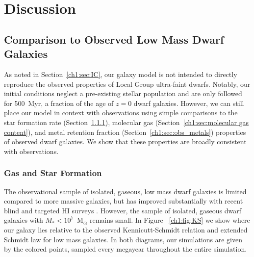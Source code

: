 \section{Discussion}
\label{ch1:sec:discussion}

\subsection{Comparison to Observed Low Mass Dwarf Galaxies}
\label{ch1:sec:observation}

As noted in Section~\ref{ch1:sec:IC}, our galaxy model is not intended to directly reproduce the observed properties of Local Group ultra-faint dwarfs. Notably, our initial conditions neglect a pre-existing stellar population and are only followed for 500~Myr, a fraction of the age of $z = 0$ dwarf galaxies. However, we can still place our model in context with observations using simple comparisons to the star formation rate (Section~\ref{ch1:sec:gas_sf}), molecular gas (Section~\ref{ch1:sec:molecular gas content}), and metal retention fraction (Section~\ref{ch1:sec:obs_metals}) properties of observed dwarf galaxies. We show that these properties are broadly consistent with observations.

\subsubsection{Gas and Star Formation}
\label{ch1:sec:gas_sf}

The observational sample of isolated, gaseous, low mass dwarf galaxies is limited compared to more massive galaxies, but has improved substantially with recent blind and targeted HI surveys \citep[e.g.][]{Giovanelli2005, Geha2006, Geha2012, Walter2008, Cannon2011, Haynes2011, Hunter2012, Bradford2015, James2015, Tollerud2015, Sand2015, Wang2017}. However, the sample of isolated, gaseous dwarf galaxies with $M_{*} < 10^{7}$~M$_{\odot}$ remains small. In Figure ~\ref{ch1:fig:KS} we show where our galaxy lies relative to the observed Kennicutt-Schmidt relation and extended Schmidt law for low mass galaxies. In both diagrams, our simulations are given by the colored points, sampled every megayear throughout the entire simulation.


